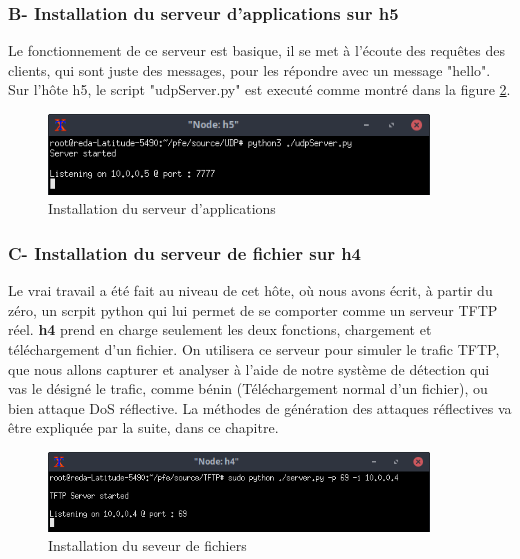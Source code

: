 \subsubsection{B- Installation du serveur d'applications sur h5}
Le fonctionnement de ce serveur est basique, il se met à l'écoute des requêtes des clients, qui sont juste des messages, pour les répondre avec un message "hello". Sur l'hôte h5, le script "udpServer.py" est executé comme montré dans la figure \ref{fig:udpServer}.
\begin{figure}[h]
\centering
\includegraphics[width=0.9\textwidth]{Figures/simulation/mininet/UDP/server/start}
\decoRule
\caption{Installation du serveur d'applications}
\label{fig:udpServer}
\end{figure}

\subsubsection{C- Installation du serveur de fichier sur h4}
Le vrai travail a été fait au niveau de cet hôte, où nous avons écrit, à partir du zéro, un scrpit python qui lui permet de se comporter comme un serveur TFTP réel. \textbf{h4} prend en charge seulement les deux fonctions, chargement et téléchargement d'un fichier. On utilisera ce serveur pour simuler le trafic TFTP, que nous allons capturer et analyser à l'aide de notre système de détection qui vas le désigné le trafic, comme bénin (Téléchargement normal d'un fichier), ou bien attaque DoS réflective. La méthodes de génération des attaques réflectives va être expliquée par la suite, dans ce chapitre.
\begin{figure}[h]
\centering
\includegraphics[width=0.9\textwidth]{Figures/simulation/mininet/TFTP/server/start}
\decoRule
\caption{Installation du seveur de fichiers}
\label{fig:udpServer}
\end{figure}

